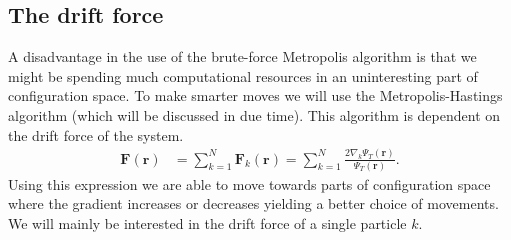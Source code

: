 \documentclass[
    a4paper, aps, twocolumn, floatfix, superscriptaddress, nofootinbib]{revtex4-1}
\newcommand{\vf}{\mathbf}
\newcommand{\1}{\mathds{1}}
\begin{document}
    \subsection{The drift force}
        A disadvantage in the use of the brute-force Metropolis algorithm is
        that we might be spending much computational resources in an
        uninteresting part of configuration space. To make smarter moves we will
        use the Metropolis-Hastings algorithm (which will be discussed in due
        time). This algorithm is dependent on the drift force of the system.
        \begin{align}
            \vf{F}(\vf{r})
            &=
            \sum_{k = 1}^N
            \vf{F}_k(\vf{r})
            =
            \sum_{k = 1}^N
            \frac{2\nabla_k\Psi_T(\vf{r})}{\Psi_T(\vf{r})}.
        \end{align}
        Using this expression we are able to move towards parts of
        configuration space where the gradient increases or decreases yielding a
        better choice of movements. We will mainly be interested in the drift
        force of a single particle $k$.
\end{document}
